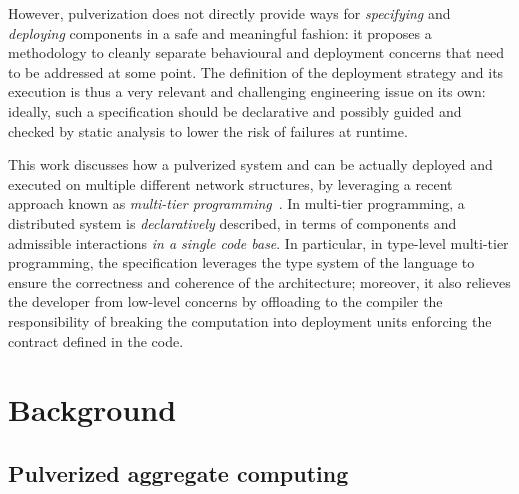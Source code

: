 However, pulverization does not directly provide ways for \emph{specifying} and \emph{deploying} components in a safe and meaningful fashion:
it proposes a methodology to cleanly separate behavioural and deployment concerns that need to be addressed at some point.
%
The definition of the deployment strategy and its execution is thus a very relevant and challenging engineering issue on its own:
ideally, such a specification should be declarative
 and possibly guided and checked by static analysis
 to lower the risk of failures at runtime.

This work discusses how a pulverized system and can be actually deployed and executed on multiple different network structures,
by leveraging a recent approach known as \emph{multi-tier programming}~\cite{DBLP:journals/csur/WeisenburgerWS20}.
%
In multi-tier programming, a distributed system is \emph{declaratively} described, in terms of components and admissible interactions \emph{in a single code base}.
%
In particular, in type-level multi-tier programming, the specification leverages the type system of the language to ensure the correctness and coherence of the architecture;
moreover, 
it also relieves the developer from low-level concerns %
by offloading to the compiler
the responsibility of breaking the computation into deployment units %
 enforcing the contract defined in the code.

\section{Background}
\label{background}
\subsection{Pulverized aggregate computing}

\def\nm{0.35cm} %
\def\tpscale{0.8}
\newcommand{\agent}{node}
\renewcommand{\boldsymbol}[1]{\mathbf{#1}}
\newcommand{\LSens}{\boldsymbol{S}}
\newcommand{\LComp}{\boldsymbol{B}}
\newcommand{\LComm}{\boldsymbol{C}}
\newcommand{\LAct}{\boldsymbol{A}}
\newcommand{\LState}{\boldsymbol{K}}

